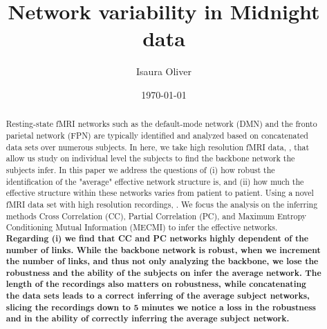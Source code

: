 \documentclass[a4paper,12pt]{article}
\title{Network variability in Midnight data}
\author{Isaura Oliver}
\date{\today}
\begin{document}
\maketitle 	

\begin{abstract}

Resting-state fMRI networks such as the default-mode network (DMN) and the fronto parietal network (FPN) are typically identified and analyzed based on concatenated data sets over numerous subjects. In here, we take high resolution fMRI data, \cite{Gordon2017}, that allow us study on individual level the subjects to find the backbone network the subjects infer. In this paper we address the questions of (i) how robust the identification of the "average" effective network structure is, and (ii) how much the effective structure within these networks varies from patient to patient. Using a novel fMRI data set with high resolution recordings, \cite{Gordon2017}. We focus the analysis on the inferring methods Cross Correlation (CC), Partial Correlation (PC), and Maximum Entropy Conditioning Mutual Information (MECMI) to infer the effective networks. 
\textbf{Regarding (i) we find that CC and PC networks highly dependent of the number of links. While the backbone network is robust, when we increment the number of links, and thus not only analyzing the backbone, we lose the robustness and the ability of the subjects on infer the average network. 
The length of the recordings also matters on robustness, while concatenating the data sets leads to a correct inferring of the average subject networks, slicing the recordings down to 5 minutes we notice a loss in the robustness and in the ability of correctly inferring the average subject network.
}%
% 

\end{abstract}
\end{document}
